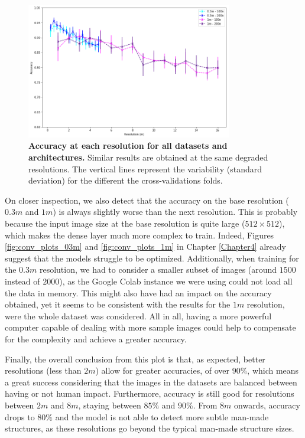 \begin{figure}[h!]
	\centering
	\includegraphics[width=0.8\textwidth]{Figures/results/acc_res_03m_1m.png}
	\captionsetup{width=1\linewidth}
	\caption{\textbf{Accuracy at each resolution for all datasets and architectures.} Similar results are obtained at the same degraded resolutions. The vertical lines represent the variability (standard deviation) for the different the cross-validations folds.}
	\label{fig:acc_res_03m_1m}
\end{figure}

On closer inspection, we also detect that the accuracy on the base resolution ($0.3m$ and $1m$) is always slightly worse than the next resolution. This is probably because the input image size at the base resolution is quite large ($512\times512$), which makes the dense layer much more complex to train. Indeed, Figures \ref{fig:conv_plots_03m} and \ref{fig:conv_plots_1m} in Chapter \ref{Chapter4} already suggest that the models struggle to be optimized. Additionally, when training for the $0.3m$ resolution, we had to consider a smaller subset of images (around $1500$ instead of $2000$), as the Google Colab instance we were using could not load all the data in memory. This might also have had an impact on the accuracy obtained, yet it seems to be consistent with the results for the $1m$ resolution, were the whole dataset was considered. All in all, having a more powerful computer capable of dealing with more sample images could help to compensate for the complexity and achieve a greater accuracy. 

Finally, the overall conclusion from this plot is that, as expected, better resolutions (less than $2m$) allow for greater accuracies, of over $90\%$, which means a great success considering that the images in the datasets are balanced between having or not human impact. Furthermore, accuracy is still good for resolutions between $2m$ and $8m$, staying between $85\%$ and $90\%$. From $8m$ onwards, accuracy drops to $80\%$ and the model is not able to detect more subtle man-made structures, as these resolutions go beyond the typical man-made structure sizes.

